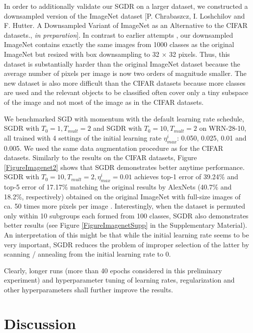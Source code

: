 \documentclass{article} %
\begin{document}
In order to additionally validate our SGDR on a larger dataset, we constructed a downsampled version of the ImageNet dataset [P. Chrabaszcz, I. Loshchilov and F. Hutter. {A Downsampled Variant of ImageNet as an Alternative to the CIFAR datasets.}, \textit{in preparation}]. In contrast to earlier attempts \citep{TinyImagenet}, our downsampled ImageNet contains exactly the same images from 1000 classes as the original ImageNet but resized with box downsampling to 32 $\times$ 32 pixels. Thus, this dataset is substantially harder than the original ImageNet dataset because the average number of pixels per image is now two orders of magnitude smaller. The new dataset is also more difficult than the CIFAR datasets because more classes are used and the relevant objects to be classified often cover only a tiny subspace of the image and not most of the image as in the CIFAR datasets. 

We benchmarked SGD with momentum with the default learning rate schedule, SGDR with $T_0=1, T_{mult}=2$ and SGDR with $T_0=10, T_{mult}=2$ on WRN-28-10, all trained with 4 settings of the initial learning rate $\eta^i_{max}$: 0.050, 0.025, 0.01 and 0.005. We used the same data augmentation procedure as for the CIFAR datasets. 
Similarly to the results on the CIFAR datasets, Figure \ref{FigureImagenet2} shows that SGDR demonstrates better anytime performance. SGDR with $T_0=10, T_{mult}=2, \eta^i_{max}=0.01$ achieves top-1 error of 39.24\% and top-5 error of 17.17\% matching the original results by AlexNets (40.7\% and 18.2\%, respectively) obtained on the original ImageNet with full-size images of ca. 50 times more pixels per image \citep{krizhevsky2012imagenet}. 
Interestingly, when the dataset is permuted only within 10 subgroups each formed from 100 classes, SGDR also demonstrates better results (see Figure \ref{FigureImagenetSupp} in the Supplementary Material). An interpretation of this might be that while the initial learning rate seems to be very important, SGDR reduces the problem of improper selection of the latter by scanning / annealing from the initial learning rate to 0. 

Clearly, longer runs (more than 40 epochs considered in this preliminary experiment) and hyperparameter tuning of learning rates, regularization and other hyperparameters shall further improve the results. 


\section{Discussion}
\end{document}
